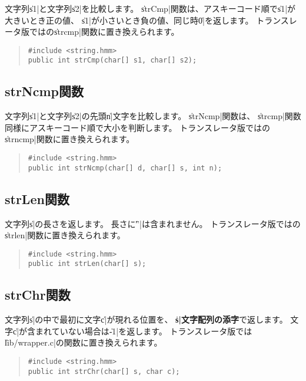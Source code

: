 文字列\|s1|と文字列\|s2|を比較します。
\|strCmp|関数は、アスキーコード順で\|s1|が大きいとき正の値、
\|s1|が小さいとき負の値、同じ時\|0|を返します。
トランスレータ版では\cl の\|strcmp|関数に置き換えられます。

\begin{quote}
\begin{verbatim}
#include <string.hmm>
public int strCmp(char[] s1, char[] s2);
\end{verbatim}
\end{quote}

\subsection{strNcmp関数}

文字列\|s1|と文字列\|s2|の先頭\|n|文字を比較します。
\|strNcmp|関数は、
\|strcmp|関数同様にアスキーコード順で大小を判断します。
トランスレータ版では\cl の\|strncmp|関数に置き換えられます。

\begin{quote}
\begin{verbatim}
#include <string.hmm>
public int strNcmp(char[] d, char[] s, int n);
\end{verbatim}
\end{quote}

\subsection{strLen関数}

文字列\|s|の長さを返します。
長さに\|'\0'|は含まれません。
トランスレータ版では\cl の\|strlen|関数に置き換えられます。

\begin{quote}
\begin{verbatim}
#include <string.hmm>
public int strLen(char[] s);
\end{verbatim}
\end{quote}

\subsection{strChr関数}

文字列\|s|の中で最初に文字\|c|が現れる位置を、
{\bf\|s|文字配列の添字}で返します。
文字\|c|が含まれていない場合は\|-1|を返します。
トランスレータ版では\|lib/wrapper.c|の関数に置き換えられます。

\begin{quote}
\begin{verbatim}
#include <string.hmm>
public int strChr(char[] s, char c);
\end{verbatim}
\end{quote}

